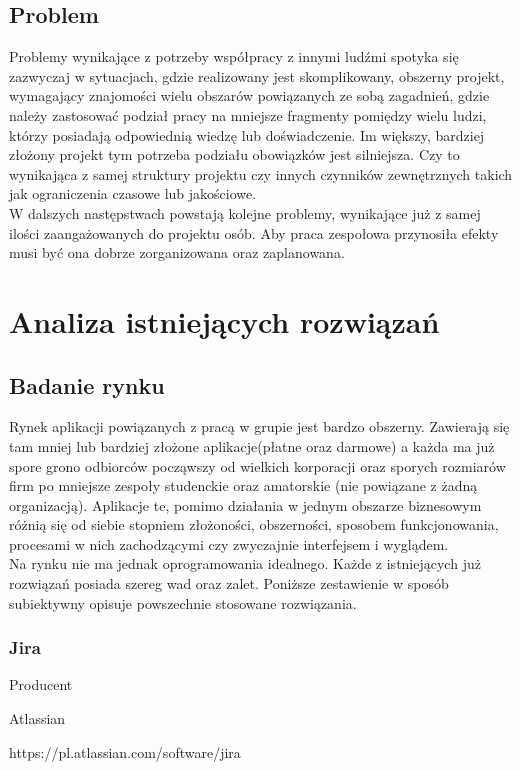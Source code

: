 \documentclass[eng,printmode]{mgr}
\begin{document}
\section{Problem}
Problemy wynikające z potrzeby współpracy z innymi ludźmi spotyka się zazwyczaj w sytuacjach, gdzie realizowany jest skomplikowany, obszerny projekt, wymagający znajomości wielu obszarów powiązanych ze sobą zagadnień, gdzie należy zastosować podział pracy na mniejsze fragmenty pomiędzy wielu ludzi, którzy posiadają odpowiednią wiedzę lub doświadczenie. Im większy, bardziej złożony projekt tym potrzeba podziału obowiązków jest silniejsza. Czy to wynikająca z samej struktury projektu czy innych czynników zewnętrznych takich jak ograniczenia czasowe lub jakościowe. \\
W dalszych następstwach powstają kolejne problemy, wynikające już z samej ilości zaangażowanych do projektu osób. Aby praca zespołowa przynosiła efekty musi być ona dobrze zorganizowana oraz zaplanowana.
\chapter{Analiza istniejących rozwiązań}  
\section{Badanie rynku}
Rynek aplikacji powiązanych z pracą w grupie jest bardzo obszerny. Zawierają się tam mniej lub bardziej złożone aplikacje(płatne oraz darmowe) a każda ma już spore grono odbiorców począwszy od wielkich korporacji oraz sporych rozmiarów firm po mniejsze zespoły studenckie oraz amatorskie (nie powiązane z żadną organizacją). Aplikacje te, pomimo działania w jednym obszarze biznesowym różnią się od siebie stopniem złożoności, obszerności, sposobem funkcjonowania, procesami w nich zachodzącymi czy zwyczajnie interfejsem i wyglądem.\\
Na rynku nie ma jednak oprogramowania idealnego. Każde z istniejących już rozwiązań posiada szereg wad oraz zalet. Poniższe zestawienie w sposób subiektywny opisuje powszechnie stosowane rozwiązania.
\subsection{Jira}
\begin{labeling}{Producent}
\item [Producent:] Atlassian
\item [Link:] https://pl.atlassian.com/software/jira
\end{labeling}
\end{document}

